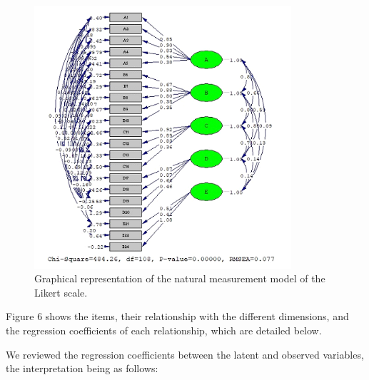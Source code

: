 \documentclass{textolivre}
\begin{document}
\begin{figure}[htbp]
 \centering
 \includegraphics[width=0.85\textwidth]{fig6-2.png}
 \caption{Graphical representation of the natural measurement model of the Likert scale.}
 \label{fig6}
\end{figure}

Figure 6 shows the items, their relationship with the different dimensions, and the regression coefficients of each relationship, which are detailed below.

We reviewed the regression coefficients between the latent and observed variables, the interpretation being as follows:
\end{document}
